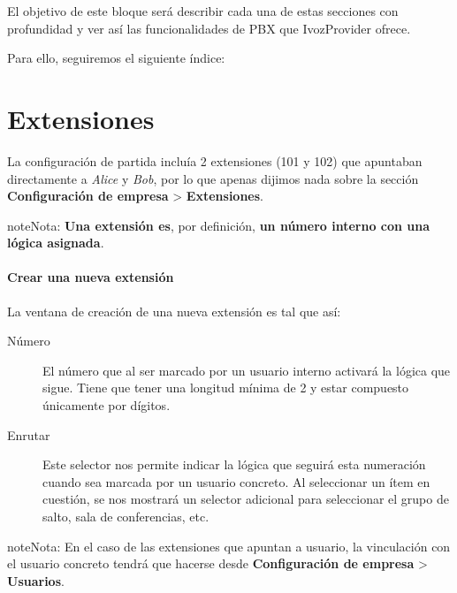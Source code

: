\documentclass[letterpaper,10pt,spanish]{sphinxmanual}
\begin{document}
El objetivo de este bloque será describir cada una de estas secciones con profundidad y ver así las funcionalidades de PBX que IvozProvider ofrece.

Para ello, seguiremos el siguiente índice:


\section{Extensiones}
\label{pbx_features/extensions:extensiones}\label{pbx_features/extensions:extensions}\label{pbx_features/extensions::doc}
La configuración de partida incluía 2 extensiones (101 y 102) que apuntaban directamente a \emph{Alice} y \emph{Bob}, por lo que apenas dijimos nada sobre la sección \textbf{Configuración de empresa} \textgreater{} \textbf{Extensiones}.

\begin{notice}{note}{Nota:}
\textbf{Una extensión es}, por definición, \textbf{un número interno con una lógica asignada}.
\end{notice}
\paragraph{Crear una nueva extensión}

La ventana de creación de una nueva extensión es tal que así:

\noindent{}
\begin{description}
\item[{Número}] \leavevmode{}\label{pbx_features/extensions:term-numero}
El número que al ser marcado por un usuario interno activará la lógica que sigue. Tiene que tener una longitud mínima de 2 y estar compuesto únicamente por dígitos.

\item[{Enrutar}] \leavevmode{}\label{pbx_features/extensions:term-enrutar}
Este selector nos permite indicar la lógica que seguirá esta numeración cuando sea marcada por un usuario concreto. Al seleccionar un ítem en cuestión, se nos mostrará un selector adicional para seleccionar el grupo de salto, sala de conferencias, etc.

\end{description}

\begin{notice}{note}{Nota:}
En el caso de las extensiones que apuntan a usuario, la vinculación con el usuario concreto tendrá que hacerse desde \textbf{Configuración de empresa} \textgreater{} \textbf{Usuarios}.
\end{notice}
\end{document}
